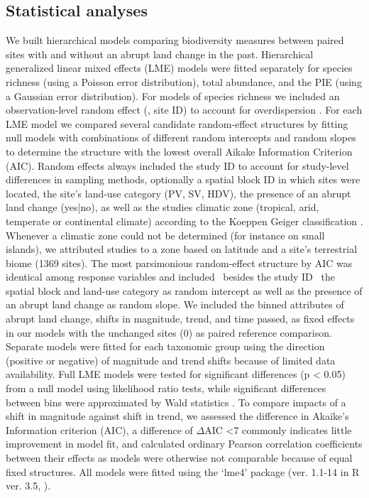 \subsection{Statistical analyses} 
\label{C03_0204}
We built hierarchical models comparing biodiversity measures between paired sites with and without an abrupt land change in the past. Hierarchical generalized linear mixed effects (LME) models were fitted separately for species richness (using a Poisson error distribution), total abundance, and the PIE (using a Gaussian error distribution). For models of species richness we included an observation-level random effect (\ie, site ID) to account for overdispersion  \citep{Harrison2015}. For each LME model we compared several candidate random-effect structures by fitting null models with combinations of different random intercepts and random slopes to determine the structure with the lowest overall Aikake Information Criterion (AIC). Random effects always included the study ID to account for study-level differences in sampling methods, optionally a spatial block ID in which sites were located, the site’s land-use category (PV, SV, HDV), the presence of an abrupt land change (yes|no), as well as the studies climatic zone (tropical, arid, temperate or continental climate) according to the Koeppen Geiger classification \citep{Peel2007}. Whenever a climatic zone could not be determined (for instance on small islands), we attributed studies to a zone based on latitude and a site’s terrestrial biome (1369 sites). The most parsimonious random-effect structure by AIC was identical among response variables and included \textendash\ besides the study ID \textendash\ the spatial block and land-use category as random intercept as well as the presence of an abrupt land change as random slope. We included the binned attributes of abrupt land change, \eg shifts in magnitude, trend, and time passed, as fixed effects in our models with the unchanged sites ($0$) as paired reference comparison. Separate models were fitted for each taxonomic group using the direction (positive or negative) of magnitude and trend shifts because of limited data availability. Full LME models were tested for significant differences (p < 0.05) from a null model using likelihood ratio tests, while significant differences between bins were approximated by Wald statistics \citep{lme4}. To compare impacts of a shift in magnitude against shift in trend, we assessed the difference in Akaike’s Information criterion (AIC), a difference of $\Delta$AIC <7 commonly indicates little improvement in model fit, and calculated ordinary Pearson correlation coefficients between their effects as models were otherwise not comparable because of equal fixed structures. All models were fitted using the ‘lme4’ package (ver. 1.1-14 in R ver. 3.5, \cite{lme4,RTeam2014}). 

